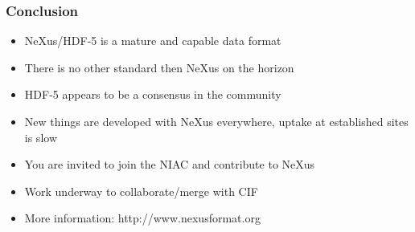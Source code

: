 \documentclass{beamer}
\begin{document}
\begin{frame} \frametitle{Conclusion }
\begin{itemize}
\item NeXus/HDF-5 is a mature and capable data format
\item There is no other standard then NeXus on the horizon
\item HDF-5 appears to be a consensus in the community
\item New things are developed with NeXus everywhere, uptake at established sites is slow
\item You are invited to join the NIAC and contribute to NeXus
\item Work underway to collaborate/merge with CIF 
\item More information: http://www.nexusformat.org
\end{itemize}
\end{frame}
\end{document}

